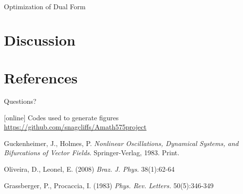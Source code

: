 \documentclass[12pt]{beamer}
\begin{document}
\begin{frame}{Optimization of Dual Form}

\end{frame}

\section{Discussion}

\section*{References}
\begin{frame}{Questions?}
\begin{thebibliography}{10}    
[online]
 Codes used to generate figures
\url{https://github.com/snagcliffs/Amath575project}

\beamertemplatebookbibitems %
 Guckenheimer, J., Holmes, P. \textit{Nonlinear Oscillations, Dynamical Systems, and Bifurcations of Vector Fields}. Springer-Verlag, 1983. Print.

\beamertemplatearticlebibitems %
  Oliveira, D., Leonel, E. (2008) \textit{Braz. J. Phys.} 38(1):62-64

 Grassberger, P., Procaccia, I. (1983) \textit{Phys. Rev. Letters.} 50(5):346-349

\end{thebibliography}
\end{frame}
\end{document}
